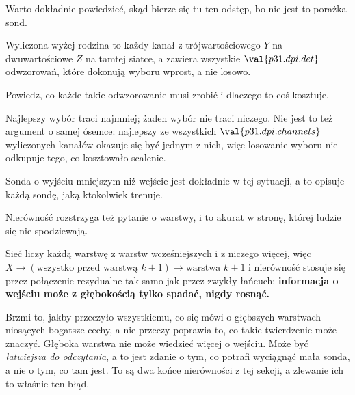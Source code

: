 \begin{fr}
Warto dokładnie powiedzieć, skąd bierze się tu ten odstęp, bo nie jest to
porażka sond.

Wyliczona wyżej rodzina to każdy kanał z trójwartościowego $Y$ na
dwuwartościowe $Z$ na tamtej siatce, a zawiera wszystkie
$\val{p31.dpi.det}$ odwzorowań, które dokonują wyboru wprost, a nie
losowo.

Powiedz, co każde takie odwzorowanie musi zrobić i dlaczego to coś kosztuje.
\dotline
\nextframe
\end{fr}

\begin{fr}

Najlepszy wybór traci najmniej; żaden wybór nie traci niczego. Nie jest to
też argument o samej ósemce: najlepszy ze wszystkich
$\val{p31.dpi.channels}$ wyliczonych kanałów okazuje się być jednym z nich,
więc losowanie wyboru nie odkupuje tego, co kosztowało scalenie.

Sonda o wyjściu mniejszym niż wejście jest dokładnie w tej sytuacji, a to
opisuje każdą sondę, jaką ktokolwiek trenuje.
\end{fr}

\begin{fr}
\begin{aibox}
Nierówność rozstrzyga też pytanie o warstwy, i to akurat w stronę, której
ludzie się nie spodziewają.

Sieć liczy każdą warstwę z warstw wcześniejszych i z niczego więcej, więc
$X \to (\text{wszystko przed warstwą } k+1) \to \text{warstwa } k+1$
i nierówność stosuje się \dash{} przez połączenie rezydualne tak samo jak
przez zwykły łańcuch:
\textbf{informacja o wejściu może z głębokością tylko spadać, nigdy rosnąć.}

Brzmi to, jakby przeczyło wszystkiemu, co się mówi o głębszych warstwach
niosących bogatsze cechy, a nie przeczy \dash{} poprawia to, co takie
twierdzenie może znaczyć. Głęboka warstwa nie może wiedzieć więcej o
wejściu. Może być \emph{łatwiejsza do odczytania}, a to jest zdanie o tym, co
potrafi wyciągnąć mała sonda, a nie o tym, co tam jest. To są dwa końce
nierówności z tej sekcji, a zlewanie ich to właśnie ten błąd.
\end{aibox}

\end{fr}

